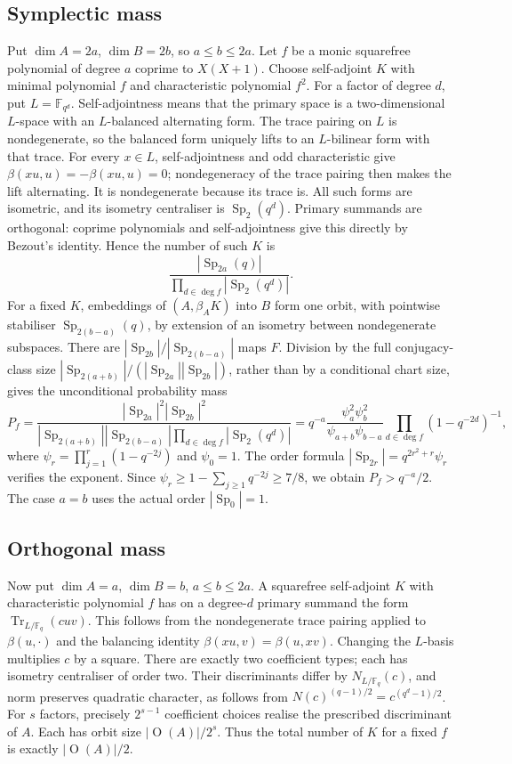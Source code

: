 \documentclass[11pt]{article}
\newcommand{\F}{\mathbb F}
\newcommand{\Sp}{\operatorname{Sp}}
\newcommand{\Or}{\operatorname O}
\newcommand{\Tr}{\operatorname{Tr}}
\begin{document}
\subsection{Symplectic mass}
Put $\dim A=2a$, $\dim B=2b$, so $a\le b\le2a$. Let $f$ be a monic squarefree polynomial of degree $a$ coprime to $X(X+1)$. Choose self-adjoint $K$ with minimal polynomial $f$ and characteristic polynomial $f^2$. For a factor of degree $d$, put $L=\F_{q^d}$. Self-adjointness means that the primary space is a two-dimensional $L$-space with an $L$-balanced alternating form. The trace pairing on $L$ is nondegenerate, so the balanced form uniquely lifts to an $L$-bilinear form with that trace. For every $x\in L$, self-adjointness and odd characteristic give $\beta(xu,u)=-\beta(xu,u)=0$; nondegeneracy of the trace pairing then makes the lift alternating. It is nondegenerate because its trace is. All such forms are isometric, and its isometry centraliser is $\Sp_2(q^d)$. Primary summands are orthogonal: coprime polynomials and self-adjointness give this directly by Bezout's identity. Hence the number of such $K$ is
\[
\frac{|\Sp_{2a}(q)|}{\prod_{d\in\deg f}|\Sp_2(q^d)|}.
\]
For a fixed $K$, embeddings of $(A,\beta_AK)$ into $B$ form one orbit, with pointwise stabiliser $\Sp_{2(b-a)}(q)$, by extension of an isometry between nondegenerate subspaces. There are $|\Sp_{2b}|/|\Sp_{2(b-a)}|$ maps $F$. Division by the full conjugacy-class size $|\Sp_{2(a+b)}|/(|\Sp_{2a}||\Sp_{2b}|)$, rather than by a conditional chart size, gives the unconditional probability mass
\begin{equation}\label{spmass}
P_f=\frac{|\Sp_{2a}|^2|\Sp_{2b}|^2}{|\Sp_{2(a+b)}||\Sp_{2(b-a)}|\prod_{d\in\deg f}|\Sp_2(q^d)|}
=q^{-a}\frac{\psi_a^2\psi_b^2}{\psi_{a+b}\psi_{b-a}}\prod_{d\in\deg f}(1-q^{-2d})^{-1},
\end{equation}
where $\psi_r=\prod_{j=1}^r(1-q^{-2j})$ and $\psi_0=1$. The order formula $|\Sp_{2r}|=q^{2r^2+r}\psi_r$ verifies the exponent. Since $\psi_r\ge1-\sum_{j\ge1}q^{-2j}\ge7/8$, we obtain $P_f>q^{-a}/2$. The case $a=b$ uses the actual order $|\Sp_0|=1$.

\subsection{Orthogonal mass}
Now put $\dim A=a$, $\dim B=b$, $a\le b\le2a$. A squarefree self-adjoint $K$ with characteristic polynomial $f$ has on a degree-$d$ primary summand the form $\Tr_{L/\F_q}(cuv)$. This follows from the nondegenerate trace pairing applied to $\beta(u,\cdot)$ and the balancing identity $\beta(xu,v)=\beta(u,xv)$. Changing the $L$-basis multiplies $c$ by a square. There are exactly two coefficient types; each has isometry centraliser of order two. Their discriminants differ by $N_{L/\F_q}(c)$, and norm preserves quadratic character, as follows from $N(c)^{(q-1)/2}=c^{(q^d-1)/2}$. For $s$ factors, precisely $2^{s-1}$ coefficient choices realise the prescribed discriminant of $A$. Each has orbit size $|\Or(A)|/2^s$. Thus the total number of $K$ for a fixed $f$ is exactly $|\Or(A)|/2$.
\end{document}
